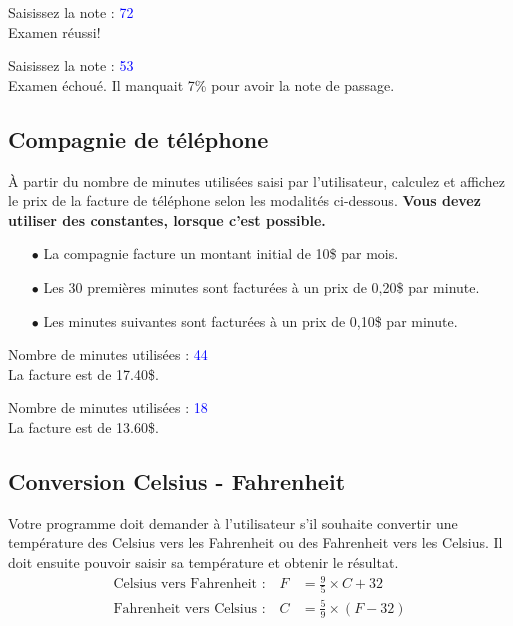 \documentclass[12pt]{article}
\newenvironment{console}
	{
	\tcolorbox[title={Sortie console}, sharp corners = south, boxsep = 1.5mm]{} \tt
	}{\endtcolorbox}
\begin{document}
\begin{console}
Saisissez la note :  \textcolor{blue}{72} \\
Examen réussi!
\end{console}

\begin{console}
Saisissez la note :  \textcolor{blue}{53} \\
Examen échoué. Il manquait 7\% pour avoir la note de passage.
\end{console}


% 
%
%

\subsection{Compagnie de téléphone}\label{ex-telephone}

À partir du nombre de minutes utilisées saisi par l’utilisateur, calculez et affichez le prix de la facture de téléphone selon les modalités ci-dessous. \textbf{Vous devez utiliser des constantes, lorsque c'est possible.}

\begin{itemize}
	\item[$\bullet$] La compagnie facture un montant initial de 10\$ par mois.
	\item[$\bullet$] Les 30 premières minutes sont facturées à un prix de 0,20\$ par minute.
	\item[$\bullet$] Les minutes suivantes sont facturées à un prix de 0,10\$ par minute.
\end{itemize}

\begin{console}
Nombre de minutes utilisées :  \textcolor{blue}{44} \\
La facture est de 17.40\$.
\end{console}

\begin{console}
Nombre de minutes utilisées :  \textcolor{blue}{18} \\
La facture est de 13.60\$.
\end{console}

%
%
%
%

\subsection{Conversion Celsius - Fahrenheit}

Votre programme doit demander à l'utilisateur s'il souhaite convertir une température des Celsius vers les Fahrenheit ou des Fahrenheit vers les Celsius. Il doit ensuite pouvoir saisir sa température et obtenir le résultat.
%
\begin{align*}
	\text{Celsius vers Fahrenheit :} \quad F &= \frac{9}{5} \times C + 32\\[5pt]
	\text{Fahrenheit vers Celsius :} \quad C &= \frac{5}{9} \times (F - 32)
\end{align*}
\end{document}
